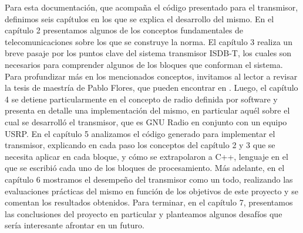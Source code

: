 Para esta documentación, que acompaña el código presentado para el transmisor, definimos seis capítulos en los que se explica el desarrollo del mismo. En el capítulo 2 presentamos algunos de los conceptos fundamentales de telecomunicaciones sobre los que se construye la norma. El capítulo 3 realiza un breve pasaje por los puntos clave del sistema transmisor ISDB-T, los cuales son necesarios para comprender algunos de los bloques que conforman el sistema. Para profundizar más en los mencionados conceptos, invitamos al lector a revisar la tesis de maestría de Pablo Flores, que pueden encontrar en \cite{gr-isdbt}. Luego, el capítulo 4 se detiene particularmente en el concepto de radio definida por software y  presenta en detalle una implementación del mismo, en particular aquél sobre el cual se desarrolló el transmisor, que es GNU Radio en conjunto con un equipo USRP. En el capítulo 5 analizamos el código generado para implementar el transmisor, explicando en cada paso los conceptos del capítulo 2 y 3 que se necesita aplicar en cada bloque, y cómo se extrapolaron a C++, lenguaje en el que se escribió cada uno de los bloques de procesamiento. Más adelante, en el capítulo 6 mostramos el desempeño del transmisor como un todo, realizando las evaluaciones prácticas del mismo en función de los objetivos de este proyecto y se comentan los resultados obtenidos. Para terminar, en el capítulo 7, presentamos las conclusiones del proyecto en particular y planteamos algunos desafíos que sería interesante afrontar en un futuro.






